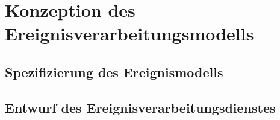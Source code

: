 \section{Konzeption des Ereignisverarbeitungsmodells}\label{sec:ereignismodell}

\subsection{Spezifizierung des Ereignismodells}



\subsection{Entwurf des Ereignisverarbeitungsdienstes}


